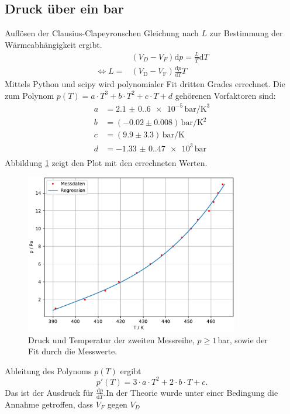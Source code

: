 \subsection{Druck über ein bar}
Auflösen der Clausius-Clapeyronschen Gleichung nach $L$ zur Bestimmung der Wärmeabhängigkeit ergibt.\\
\begin{align}
  &(V_D-V_F)\text{d}p=\frac{L}{T}\text{d}T\nonumber\\
  \Leftrightarrow L=&(V_\text{D}-V_\text{F})\frac{\text{d}p}{\text{d}T}T\label{eqn:L(V,T)}
\end{align}
Mittels Python und scipy wird polynomialer Fit dritten Grades errechnet. Die 
zum Polynom $p(T)=a\cdot T^3+b\cdot T^2+c\cdot T+d$ gehörenen Vorfaktoren sind:
\begin{align*}
  a &= \num{2.1(0.6)e-5}\,\si{\bar\per\kelvin\cubed}\\
  b &= (-0.02 ± 0.008)\,\si{\bar\per\kelvin\squared}\\
  c &= (9.9 ± 3.3)\,\si{\bar\per\kelvin}\\
  d &= \num{-1.33(0.47)e3}\,\si{\bar}\\
\end{align*}
Abbildung \ref{fig:Druck_groß} zeigt den Plot mit den errechneten Werten.
\begin{figure}[H]
\centering
\includegraphics[height=7cm]{plotd.pdf}
\caption{Druck und Temperatur der zweiten Messreihe, $p\geq 1$\,bar, sowie 
der Fit durch die Messwerte.}
\label{fig:Druck_groß}
\end{figure}
Ableitung des Polynoms $p(T)$ ergibt
\begin{equation}
p'(T)=3\cdot a\cdot T^2+2\cdot b\cdot T+c.
\end{equation}
Das ist der Ausdruck für $\frac{\text{d}p}{\text{d}T}$.In der Theorie wurde unter einer Bedingung die Annahme getroffen, dass $V_F$ gegen $V_D$
